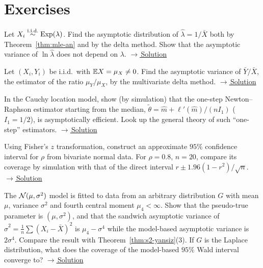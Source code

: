 \documentclass[main.tex]{subfiles}
\begin{document}
\section{Exercises}

\begin{exercise}\label{exr:12-1}
Let $X_i\overset{\text{i.i.d.}}{\sim}\text{Exp}(\lambda)$. Find the asymptotic distribution of $\hat\lambda=1/\bar X$ both by Theorem~\ref{thm:mle-an} and by the delta method. Show that the asymptotic variance of $\ln\hat\lambda$ does not depend on $\lambda$.
\hfill\hyperref[coz:12-1]{\footnotesize$\rightarrow$\,Solution}
\end{exercise}

\begin{exercise}\label{exr:12-2}
Let $(X_i,Y_i)$ be i.i.d.\ with $\mathbb{E} X=\mu_X\ne0$. Find the asymptotic variance of $\bar Y/\bar X$, the estimator of the ratio $\mu_Y/\mu_X$, by the multivariate delta method.
\hfill\hyperref[coz:12-2]{\footnotesize$\rightarrow$\,Solution}
\end{exercise}

\begin{exercise}\label{exr:12-3}
In the Cauchy location model, show (by simulation) that the one-step Newton--Raphson estimator starting from the median, $\tilde\theta=\hat m+\ell'(\hat m)/(n I_1)$ ($I_1=1/2$), is asymptotically efficient. Look up the general theory of such ``one-step'' estimators.
\hfill\hyperref[coz:12-3]{\footnotesize$\rightarrow$\,Solution}
\end{exercise}

\begin{exercise}\label{exr:12-4}
Using Fisher's $z$ transformation, construct an approximate $95\%$ confidence interval for $\rho$ from bivariate normal data. For $\rho=0.8$, $n=20$, compare its coverage by simulation with that of the direct interval $r\pm1.96(1-r^2)/\sqrt n$.
\hfill\hyperref[coz:12-4]{\footnotesize$\rightarrow$\,Solution}
\end{exercise}

\begin{exercise}\label{exr:12-5}
The $\mathcal{N}(\mu,\sigma^2)$ model is fitted to data from an arbitrary distribution $G$ with mean $\mu$, variance $\sigma^2$ and fourth central moment $\mu_4<\infty$. Show that the pseudo-true parameter is $(\mu,\sigma^2)$, and that the sandwich asymptotic variance of $\hat\sigma^2=\frac1n\sum(X_i-\bar X)^2$ is $\mu_4-\sigma^4$ while the model-based asymptotic variance is $2\sigma^4$. Compare the result with Theorem~\ref{thm:s2-yansiz}(3). If $G$ is the Laplace distribution, what does the coverage of the model-based $95\%$ Wald interval converge to?
\hfill\hyperref[coz:12-5]{\footnotesize$\rightarrow$\,Solution}
\end{exercise}
\end{document}
